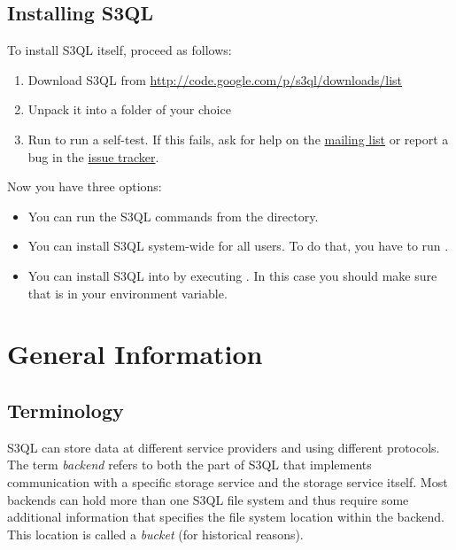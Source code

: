\documentclass[letterpaper,10pt,english]{sphinxmanual}
\begin{document}
\section{Installing S3QL}
\label{installation:inst-s3ql}\label{installation:installing-s3ql}
To install S3QL itself, proceed as follows:
\begin{enumerate}
\item {} 
Download S3QL from \href{http://code.google.com/p/s3ql/downloads/list}{http://code.google.com/p/s3ql/downloads/list}

\item {} 
Unpack it into a folder of your choice

\item {} 
Run  to run a self-test. If this fails, ask
for help on the \href{http://groups.google.com/group/s3ql}{mailing list} or report a bug in the
\href{http://code.google.com/p/s3ql/issues/list}{issue tracker}.

\end{enumerate}

Now you have three options:
\begin{itemize}
\item {} 
You can run the S3QL commands from the  directory.

\item {} 
You can install S3QL system-wide for all users. To do that, you
have to run .

\item {} 
You can install S3QL into  by executing . In this case you should make sure that
 is in your  environment variable.

\end{itemize}


\chapter{General Information}
\label{general:general-information}\label{general::doc}

\section{Terminology}
\label{general:terminology}
S3QL can store data at different service providers and using different
protocols. The term \emph{backend} refers to both the part of S3QL that
implements communication with a specific storage service and the
storage service itself. Most backends can hold more than one S3QL file
system and thus require some additional information that specifies the
file system location within the backend. This location is called a
\emph{bucket} (for historical reasons).
\end{document}
